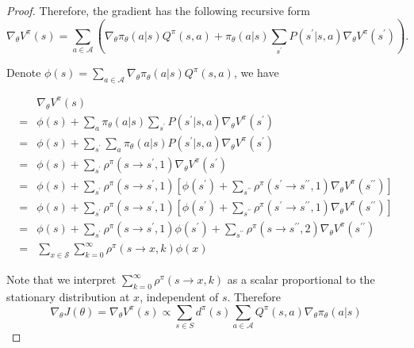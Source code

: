 \begin{refsection}
\begin{proof}
Therefore, the gradient has the following recursive form
$$\nabla_{\theta} V^{\pi}(s)=\sum_{a \in \mathcal{A}}\left(\nabla_{\theta} \pi_{\theta}(a | s) Q^{\pi}(s, a)+\pi_{\theta}(a | s) \sum_{s^{\prime}} P\left(s^{\prime} | s, a\right) \nabla_{\theta} V^{\pi}\left(s^{\prime}\right)\right).$$

Denote $\phi(s)=\sum_{a \in \mathcal{A}} \nabla_{\theta} \pi_{\theta}(a | s) Q^{\pi}(s, a)$, we have


\begin{align*} 
& \nabla_{\theta} V^{\pi}(s) \\
=& \phi(s)+\sum_{a} \pi_{\theta}(a | s) \sum_{s^{\prime}} P\left(s^{\prime} | s, a\right) \nabla_{\theta} V^{\pi}\left(s^{\prime}\right) \\
=& \phi(s)+\sum_{s^{\prime}} \sum_{a} \pi_{\theta}(a | s) P\left(s^{\prime} | s, a\right) \nabla_{\theta} V^{\pi}\left(s^{\prime}\right) \\
=& \phi(s)+\sum_{s^{\prime}} \rho^{\pi}\left(s \rightarrow s^{\prime}, 1\right) \nabla_{\theta} V^{\pi}\left(s^{\prime}\right) \\
=& \phi(s)+\sum_{s^{\prime}} \rho^{\pi}\left(s \rightarrow s^{\prime}, 1\right)\left[\phi\left(s^{\prime}\right)+\sum_{s^{\prime \prime}} \rho^{\pi}\left(s^{\prime} \rightarrow s^{\prime \prime}, 1\right) \nabla_{\theta} V^{\pi}\left(s^{\prime \prime}\right)\right] \\
=& \phi(s)+\sum_{s^{\prime}} \rho^{\pi}\left(s \rightarrow s^{\prime}, 1\right)\left[\phi\left(s^{\prime}\right)+\sum_{s^{\prime \prime}} \rho^{\pi}\left(s^{\prime} \rightarrow s^{\prime \prime}, 1\right) \nabla_{\theta} V^{\pi}\left(s^{\prime \prime}\right)\right] \\
=& \phi(s)+\sum_{s^{\prime}} \rho^{\pi}\left(s \rightarrow s^{\prime}, 1\right) \phi\left(s^{\prime}\right)+\sum_{s^{\prime \prime}} \rho^{\pi}\left(s \rightarrow s^{\prime \prime}, 2\right) \nabla_{\theta} V^{\pi}\left(s^{\prime \prime}\right) \\
=& \sum_{x \in \mathcal{S}} \sum_{k=0}^{\infty} \rho^{\pi}(s \rightarrow x, k) \phi(x)
\end{align*}

Note that we interpret $\sum_{k=0}^{\infty} \rho^{\pi}(s \rightarrow x, k)$ as a scalar proportional to the stationary distribution at $x$, independent of $s$. 
Therefore
  	$$\nabla_\theta J(\theta) = \nabla_{\theta} V^\pi(s) \propto \sum_{s \in S} d^{\pi}(s) \sum_{a \in \mathcal{A}} Q^{\pi}(s, a) \nabla_{\theta} \pi_{\theta}(a | s)$$


\end{proof}
\end{refsection}
